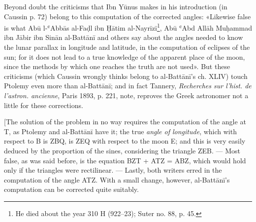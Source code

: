 \documentclass[11pt]{article}
\begin{document}
\par Beyond doubt the criticisms that Ibn Yūnus makes in his introduction (in Caussin p. 72) belong to this computation of the corrected angles: «Likewise false is what Abū l-ʿAbbās al-Faḍl ibn Ḥātim al-Nayrīzī\footnote{He died about the year 310 H (922–23); Suter no. 88, p. 45.}, Abū ʿAbd Allāh Muḥammad ibn Jābir ibn Sinān al-Battānī and others say about the angles needed to know the lunar parallax in longitude and latitude, in the computation of eclipses of the sun; for it does not lead to a true knowledge of the apparent place of the moon, since the methods by which one reaches the truth are not used». But these criticisms (which Caussin wrongly thinks belong to al-Battānī's ch. XLIV) touch Ptolemy even more than al-Battānī; and in fact Tannery, \emph{Recherches sur l’hist. de l’astron. ancienne}, Paris 1893, p. 221, note, reproves the Greek astronomer not a little for these corrections.\par
\par [The solution of the problem in no way requires the computation of the angle at T, as Ptolemy and al-Battānī have it; the true \emph{angle of longitude}, which with respect to B is ZBQ, is ZEQ with respect to the moon E; and this is very easily deduced by the proportion of the sines, considering the triangle ZEB. — Most false, as was said before, is the equation BZT + ATZ = ABZ, which would hold only if the triangles were rectilinear. — Lastly, both writers erred in the computation of the angle ATZ. With a small change, however, al-Battānī's computation can be corrected quite suitably.\par
\begin{center}\end{center}
\end{document}
